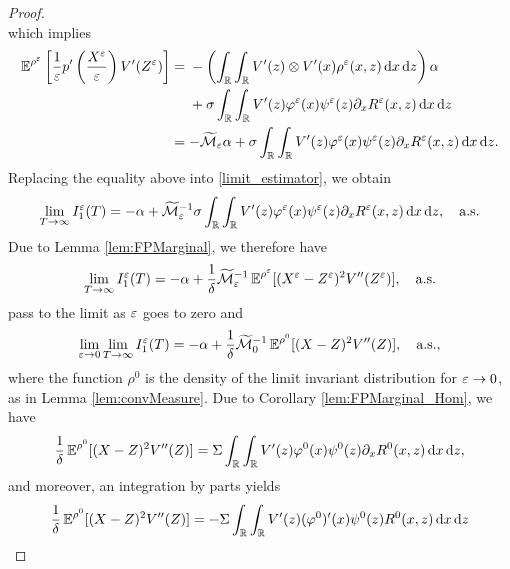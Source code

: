 \documentclass[10pt]{article}
\begin{document}
\begin{proof}
\begin{equation}
\end{equation}
which implies
\begin{align}
	\operatorname{\mathbb{E}}^{\rho^\varepsilon} \left [ \frac{1}{\varepsilon} p' \left ( \frac{X^\varepsilon}{\varepsilon} \right ) V'(Z^\varepsilon) \right ] &= 
	\begin{aligned}[t]
		&- \left(\int_{\mathbb{R}} \int_{\mathbb{R}} V'(z) \otimes V'(x) \rho^\varepsilon(x, z) \,\mathrm{d} x \,\mathrm{d} z\right) \alpha \\
		&+\sigma \int_{\mathbb{R}} \int_{\mathbb{R}} V'(z) \varphi^\varepsilon(x) \psi^\varepsilon(z) \partial_x R^\varepsilon(x,z) \,\mathrm{d} x \,\mathrm{d} z 
	\end{aligned}
	\\
	&= - \widetilde {\mathcal M}_\varepsilon\alpha + \sigma \int_{\mathbb{R}} \int_{\mathbb{R}} V'(z) \varphi^\varepsilon(x) \psi^\varepsilon(z) \partial_x R^\varepsilon(x,z) \,\mathrm{d} x \,\mathrm{d} z.
\end{align}
Replacing the equality above into \eqref{limit_estimator}, we obtain
\begin{equation}
\lim_{T \to \infty} I_1^\varepsilon(T) = -\alpha + \widetilde {\mathcal M}_\varepsilon^{-1} \sigma \int_{\mathbb{R}} \int_{\mathbb{R}} V'(z) \varphi^\varepsilon(x) \psi^\varepsilon(z) \partial_x R^\varepsilon(x,z) \,\mathrm{d} x \,\mathrm{d} z, \quad \text{a.s.}
\end{equation}
Due to Lemma \ref{lem:FPMarginal}, we therefore have
\begin{equation} \label{eq:for_zeta}
	\lim_{T \to \infty} I_1^\varepsilon(T) = -\alpha + \frac1\delta \widetilde {\mathcal M}_\varepsilon^{-1} \operatorname{\mathbb{E}}^{\rho^\varepsilon}[(X^\varepsilon - Z^\varepsilon)^2 V''(Z^\varepsilon)], \quad \text{a.s.}	
\end{equation}
 pass to the limit as $\varepsilon$ goes to zero and
\begin{equation} \label{eq:limit_estimator_2}
	\lim_{\varepsilon \to 0} \lim_{T \to \infty} I_1^\varepsilon(T) = -\alpha + \frac1\delta \widetilde {\mathcal M}_0^{-1} \operatorname{\mathbb{E}}^{\rho^0}[(X - Z)^2 V''(Z)], \quad \text{a.s.},
\end{equation}
where the function $\rho^0$ is the density of the limit invariant distribution for $\varepsilon \to 0$, as in Lemma \ref{lem:convMeasure}. Due to Corollary \ref{lem:FPMarginal_Hom}, we have
\begin{equation}\label{eq:final_result}
	\frac{1}{\delta} \operatorname{\mathbb{E}}^{\rho^0}[(X - Z)^2 V''(Z)] = \Sigma \int_{\mathbb{R}} \int_{\mathbb{R}} V'(z) \varphi^0(x) \psi^0(z) \partial_x R^0(x,z) \,\mathrm{d} x \,\mathrm{d} z,
\end{equation}
and moreover, an integration by parts yields
\begin{equation}
\begin{aligned}
	\frac{1}{\delta} \E^{\rho^0}[(X - Z)^2 V''(Z)] &= -\Sigma \int_{\R} \int_{\R} V'(z) (\phi^0)'(x) \psi^0(z) R^0(x,z) \dd x \dd z\\

\end{aligned}
\end{equation}
\end{proof}
\end{document}
